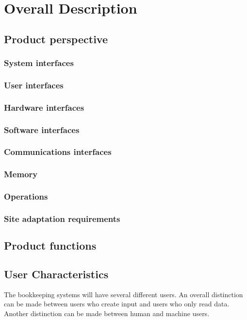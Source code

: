 \chapter{Overall Description}
\section{Product perspective}

\subsection{System interfaces}
\subsection{User interfaces}
\subsection{Hardware interfaces}
\subsection{Software interfaces}
\subsection{Communications interfaces}
\subsection{Memory}
\subsection{Operations}
\subsection{Site adaptation requirements}

\section{Product functions}

\section{User Characteristics}
The bookkeeping systems will have several different users. An overall distinction can be made between users who create input and users who only read data. Another distinction can be made between human and machine users. 

